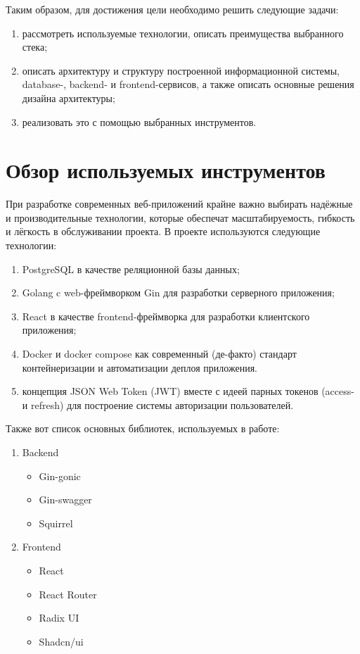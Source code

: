 \documentclass[diploma]{SCWorks}
\begin{document}
Таким образом, для достижения цели необходимо решить следующие задачи:
\begin{enumerate}
    \item рассмотреть используемые технологии, описать преимущества выбранного 
    стека;
    \item описать архитектуру и структуру построенной информационной системы, 
    database-, backend- и frontend-сервисов, а также описать основные решения
    дизайна архитектуры;
    \item реализовать это с помощью выбранных инструментов.
\end{enumerate}

\section{Обзор используемых инструментов}

При разработке современных веб-приложений крайне важно выбирать
надёжные и производительные технологии, которые обеспечат 
масштабируемость, гибкость и лёгкость в обслуживании проекта. 
В проекте используются следующие технологии:
\begin{enumerate}
    \item PostgreSQL в качестве реляционной базы данных;
    \item Golang c web-фреймворком Gin для разработки серверного приложения;
    \item React в качестве frontend-фреймворка для разработки клиентского 
    приложения;
    \item Docker и docker compose как современный (де-факто) стандарт 
    контейнеризации и автоматизации деплоя приложения.
    \item концепция JSON Web Token (JWT) вместе с идеей парных токенов (access-
    и refresh) для построение системы авторизации пользователей.
\end{enumerate}

Также вот список основных библиотек, используемых в работе:
\begin{enumerate}
    \item Backend
    \begin{itemize}
        \item Gin-gonic
        \item Gin-swagger
        \item Squirrel
    \end{itemize}
    \item Frontend
    \begin{itemize}
        \item React
        \item React Router 
        \item Radix UI
        \item Shadcn/ui
    \end{itemize}
\end{enumerate}
\end{document}
